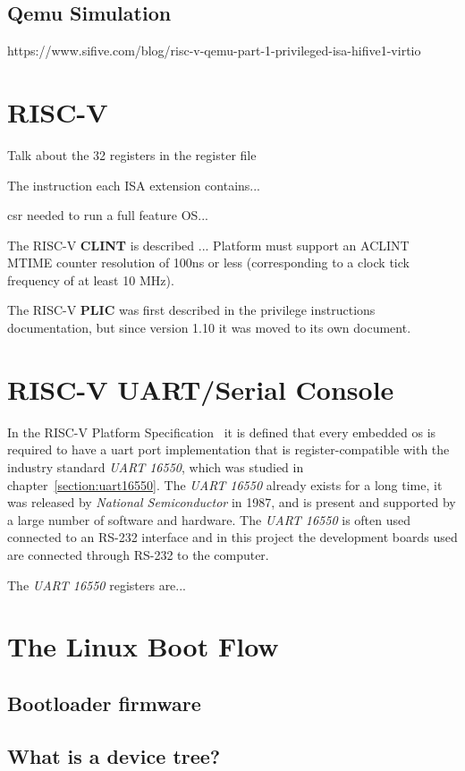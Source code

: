 \subsection{Qemu Simulation}
https://www.sifive.com/blog/risc-v-qemu-part-1-privileged-isa-hifive1-virtio

\section{RISC-V}
\label{section:riscv}
Talk about the 32 registers in the register file

The instruction each ISA extension contains...

\acrfull{csr} needed to run a full feature OS...

The RISC-V \textbf{CLINT} is described ...
Platform must support an ACLINT MTIME counter resolution of 100ns or less (corresponding to a clock tick frequency of at least 10 MHz).

The RISC-V \textbf{PLIC} was first described in the privilege instructions documentation, but since version 1.10 it was moved to its own document.

\section{RISC-V UART/Serial Console}
\label{section:serial_console}
In the RISC-V Platform Specification~\cite{riscv_platform_specification} it is defined that every embedded \acrfull{os} is required to have a \acrshort{uart} port implementation that is register-compatible with the industry standard \textit{UART 16550}, which was studied in chapter~\ref{section:uart16550}. The \textit{UART 16550} already exists for a long time, it was released by \textit{National Semiconductor} in 1987, and is present and supported by a large number of software and hardware. The \textit{UART 16550} is often used connected to an RS-232 interface and in this project the development boards used are connected through RS-232 to the computer.

The \textit{UART 16550} registers are...

\section{The Linux Boot Flow}
\label{section:linux_boot_flow}
\subsection{Bootloader firmware}
\subsection{What is a device tree?}


